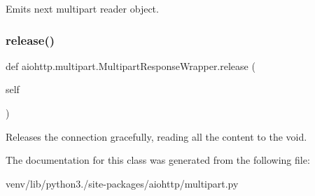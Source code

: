\begin{DoxyVerb}Emits next multipart reader object.\end{DoxyVerb}
 \mbox{\label{classaiohttp_1_1multipart_1_1_multipart_response_wrapper_a00580c25330fc7d7bada33b767c8f411}} 
\subsubsection{\texorpdfstring{release()}{release()}}
{\footnotesize\ttfamily def aiohttp.\+multipart.\+Multipart\+Response\+Wrapper.\+release (\begin{DoxyParamCaption}\item[{}]{self }\end{DoxyParamCaption})}

\begin{DoxyVerb}Releases the connection gracefully, reading all the content
to the void.\end{DoxyVerb}
 

The documentation for this class was generated from the following file\+:\begin{DoxyCompactItemize}
\item 
venv/lib/python3./site-\/packages/aiohttp/multipart.\+py\end{DoxyCompactItemize}
